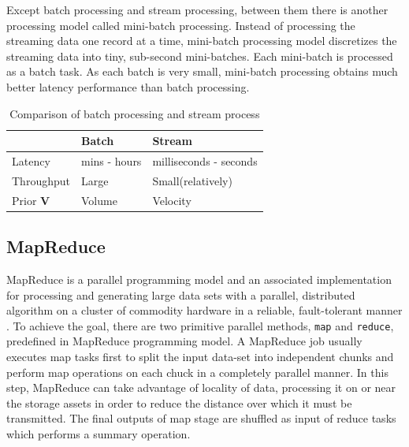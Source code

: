 Except batch processing and stream processing, between them there is another processing model called mini-batch processing. Instead of processing the streaming data one record at a time, mini-batch processing model discretizes the streaming data into tiny, sub-second mini-batches. Each mini-batch is processed as a batch task. As each batch is very small, mini-batch processing obtains much better latency performance than batch processing.

\begin{table}[H] %
\begin{tabular}{p{3.2cm} p{4.2cm} p{4.2cm}} 
\toprule %
  & Batch  & Stream \\ 
\hline 
 {\small Latency} & {\small mins - hours} & {\small milliseconds - seconds} \\
 {\small Throughput} & {\small Large} & {\small Small(relatively)}\\
 {\small Prior \textbf{V}} & {\small Volume} & {\small Velocity}\\   
\bottomrule
\end{tabular} %
\caption{Comparison of batch processing and stream process} 
\label{table:BatchVSStream}
\end{table}

\subsection{MapReduce}
MapReduce is a parallel programming model and an associated implementation for processing and generating large data sets with a parallel, distributed algorithm on a cluster of commodity hardware in a reliable, fault-tolerant manner \cite{dean2008mapreduce}. To achieve the goal, there are two primitive parallel methods, \texttt{map} and \texttt{reduce}, predefined in MapReduce programming model. A MapReduce job usually executes map tasks first to split the input data-set into independent chunks and perform map operations on each chuck in a completely parallel manner. In this step, MapReduce can take advantage of locality of data, processing it on or near the storage assets in order to reduce the distance over which it must be transmitted. The final outputs of map stage are shuffled as input of reduce tasks which performs a summary operation. 

